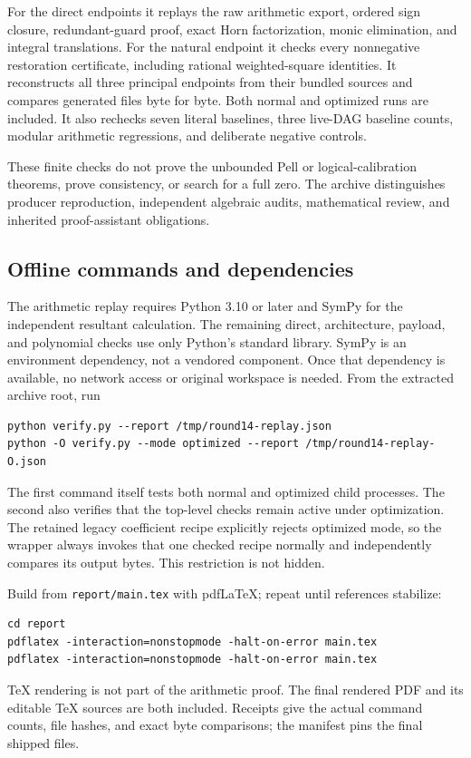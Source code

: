For the direct endpoints it replays the raw arithmetic export, ordered sign closure, redundant-guard proof, exact Horn factorization, monic elimination, and integral translations. For the natural endpoint it checks every nonnegative restoration certificate, including rational weighted-square identities. It reconstructs all three principal endpoints from their bundled sources and compares generated files byte for byte. Both normal and optimized runs are included. It also rechecks seven literal baselines, three live-DAG baseline counts, modular arithmetic regressions, and deliberate negative controls.

These finite checks do not prove the unbounded Pell or logical-calibration theorems, prove consistency, or search for a full zero. The archive distinguishes producer reproduction, independent algebraic audits, mathematical review, and inherited proof-assistant obligations.

\subsection{Offline commands and dependencies}
The arithmetic replay requires Python 3.10 or later and SymPy for the independent resultant calculation. The remaining direct, architecture, payload, and polynomial checks use only Python's standard library. SymPy is an environment dependency, not a vendored component. Once that dependency is available, no network access or original workspace is needed. From the extracted archive root, run
\begin{Verbatim}[fontsize=\small,breaklines=true]
python verify.py --report /tmp/round14-replay.json
python -O verify.py --mode optimized --report /tmp/round14-replay-O.json
\end{Verbatim}
The first command itself tests both normal and optimized child processes. The second also verifies that the top-level checks remain active under optimization. The retained legacy coefficient recipe explicitly rejects optimized mode, so the wrapper always invokes that one checked recipe normally and independently compares its output bytes. This restriction is not hidden.

Build from \texttt{report/main.tex} with pdfLaTeX; repeat until references stabilize:
\begin{Verbatim}[fontsize=\small,breaklines=true]
cd report
pdflatex -interaction=nonstopmode -halt-on-error main.tex
pdflatex -interaction=nonstopmode -halt-on-error main.tex
\end{Verbatim}
TeX rendering is not part of the arithmetic proof. The final rendered PDF and its editable TeX sources are both included. Receipts give the actual command counts, file hashes, and exact byte comparisons; the manifest pins the final shipped files.

